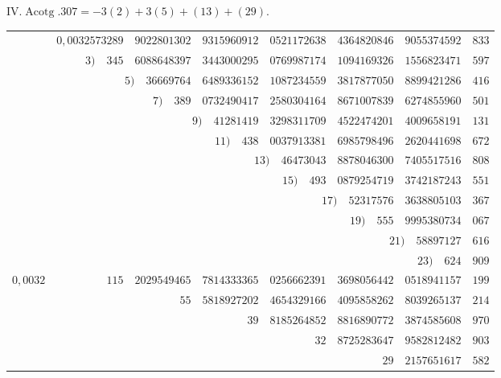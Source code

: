 \par{}
%
\begin{center}IV.\quad $\operatorname{Acotg}.307=-3(2)+3(5)+(13)+(29).$\end{center}
\begingroup\fontsize{8.5}{11}\selectfont\setlength{\tabcolsep}{2pt}
\begin{longtable}{@{}rrrrrrrr@{}}
\hline
 & $0{,}0032573289$ & $9022801302$ & $9315960912$ & $0521172638$ & $4364820846$ & $9055374592$ & $833$\\
 & $3)\quad 345$ & $6088648397$ & $3443000295$ & $0769987174$ & $1094169326$ & $1556823471$ & $597$\\
 & \multicolumn{2}{r}{$5)\quad 36669764$} & $6489336152$ & $1087234559$ & $3817877050$ & $8899421286$ & $416$\\
 & \multicolumn{2}{r}{$7)\quad 389$} & $0732490417$ & $2580304164$ & $8671007839$ & $6274855960$ & $501$\\
 &  & \multicolumn{2}{r}{$9)\quad 41281419$} & $3298311709$ & $4522474201$ & $4009658191$ & $131$\\
 &  & \multicolumn{2}{r}{$11)\quad 438$} & $0037913381$ & $6985798496$ & $2620441698$ & $672$\\
 &  &  & \multicolumn{2}{r}{$13)\quad 46473043$} & $8878046300$ & $7405517516$ & $808$\\
 &  &  & \multicolumn{2}{r}{$15)\quad 493$} & $0879254719$ & $3742187243$ & $551$\\
 &  &  &  & \multicolumn{2}{r}{$17)\quad 52317576$} & $3638805103$ & $367$\\
 &  &  &  & \multicolumn{2}{r}{$19)\quad 555$} & $9995380734$ & $067$\\
 &  &  &  &  & \multicolumn{2}{r}{$21)\quad 58897127$} & $616$\\
 &  &  &  &  & \multicolumn{2}{r}{$23)\quad 624$} & $909$\\
\hline
$0{,}0032$ & $115$ & $2029549465$ & $7814333365$ & $0256662391$ & $3698056442$ & $0518941157$ & $199$\\
 &  & $55$ & $5818927202$ & $4654329166$ & $4095858262$ & $8039265137$ & $214$\\
 &  &  & $39$ & $8185264852$ & $8816890772$ & $3874585608$ & $970$\\
 &  &  &  & $32$ & $8725283647$ & $9582812482$ & $903$\\
 &  &  &  &  & $29$ & $2157651617$ & $582$\\

\end{longtable}
